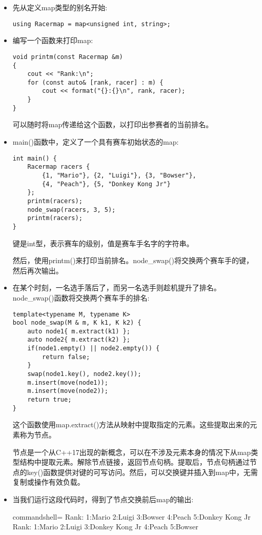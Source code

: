 \begin{itemize}
\item 
先从定义map类型的别名开始:

\begin{lstlisting}[style=styleCXX]
using Racermap = map<unsigned int, string>;
\end{lstlisting}

\item 
编写一个函数来打印map:

\begin{lstlisting}[style=styleCXX]
void printm(const Racermap &m)
{
	cout << "Rank:\n";
	for (const auto& [rank, racer] : m) {
		cout << format("{}:{}\n", rank, racer);
	}
}
\end{lstlisting}

可以随时将map传递给这个函数，以打印出参赛者的当前排名。

\item 
main()函数中，定义了一个具有赛车初始状态的map:

\begin{lstlisting}[style=styleCXX]
int main() {
	Racermap racers {
		{1, "Mario"}, {2, "Luigi"}, {3, "Bowser"},
		{4, "Peach"}, {5, "Donkey Kong Jr"}
	};
	printm(racers);
	node_swap(racers, 3, 5);
	printm(racers);
}
\end{lstlisting}

键是int型，表示赛车的级别，值是赛车手名字的字符串。

然后，使用printm()来打印当前排名。node\_swap()将交换两个赛车手的键，然后再次输出。

\item 
在某个时刻，一名选手落后了，而另一名选手则趁机提升了排名。node\_swap()函数将交换两个赛车手的排名:

\begin{lstlisting}[style=styleCXX]
template<typename M, typename K>
bool node_swap(M & m, K k1, K k2) {
	auto node1{ m.extract(k1) };
	auto node2{ m.extract(k2) };
	if(node1.empty() || node2.empty()) {
		return false;
	}
	swap(node1.key(), node2.key());
	m.insert(move(node1));
	m.insert(move(node2));
	return true;
}
\end{lstlisting}

这个函数使用map.extract()方法从映射中提取指定的元素。这些提取出来的元素称为节点。

节点是一个从C++17出现的新概念，可以在不涉及元素本身的情况下从map类型结构中提取元素。解除节点链接，返回节点句柄。提取后，节点句柄通过节点的key()函数提供对键的可写访问。然后，可以交换键并插入到map中，无需复制或操作有效负载。

\item 
当我们运行这段代码时，得到了节点交换前后map的输出:

\begin{tcblisting}{commandshell={}}
Rank:
1:Mario
2:Luigi
3:Bowser
4:Peach
5:Donkey Kong Jr
Rank:
1:Mario
2:Luigi
3:Donkey Kong Jr
4:Peach
5:Bowser
\end{tcblisting}
\end{itemize}

